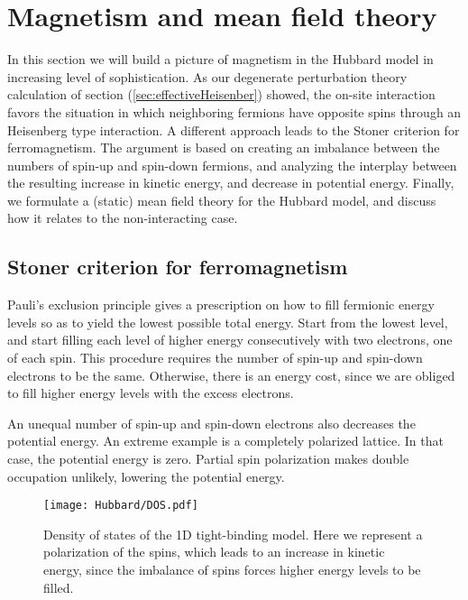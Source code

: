\section{Magnetism and mean field theory}\label{sec:magMFT}

In this section we will build a picture of magnetism in the Hubbard model in increasing level of sophistication.
As our degenerate perturbation theory  calculation of section (\ref{sec:effectiveHeisenber}) showed, the on-site interaction favors the situation in which neighboring fermions have opposite spins through an Heisenberg type interaction.
A different approach leads to the Stoner criterion for ferromagnetism.
The argument is based on creating an imbalance between the numbers of spin-up and spin-down fermions, and analyzing the interplay between the resulting increase in kinetic energy, and decrease in potential energy.
Finally, we formulate a (static) mean field theory for the Hubbard model, and discuss how it relates to the non-interacting case.

\subsection{Stoner criterion for ferromagnetism}
\label{subsec:stoner}

Pauli's exclusion principle gives a prescription on how to fill fermionic energy levels so as to yield the lowest possible total energy.
Start from the lowest level, and start filling each level of higher energy consecutively with two electrons, one of each spin.
This procedure requires the number of spin-up and spin-down electrons to be the same.
Otherwise, there is an energy cost, since we are obliged to fill higher energy levels with the excess electrons.

An unequal number of spin-up and spin-down electrons also decreases the potential energy.
An extreme example is a completely polarized lattice.
In that case, the potential energy is zero.
Partial spin polarization makes double occupation unlikely, lowering the potential energy.

\begin{figure}[H]
	\centering
\hspace{12mm}\texttt{[image: Hubbard/DOS.pdf]}
	\caption[Density of states of the \acs{1D} tight-binding model.]{Density of states of the \acs{1D} tight-binding model.
	Here we represent a polarization of the spins, which leads to an increase in kinetic energy, since the imbalance of spins forces higher energy levels to be filled.}
	\label{fig:dos}
\end{figure}

